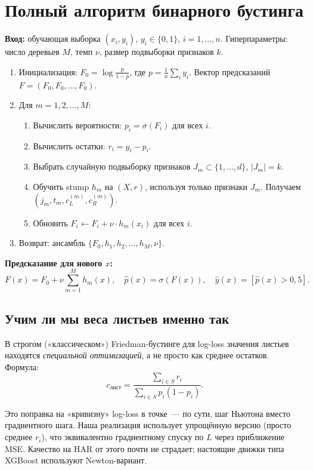\documentclass[12pt,a4paper]{article}
\begin{document}
\section{Полный алгоритм бинарного бустинга}

\textbf{Вход:} обучающая выборка $(x_i, y_i)$, $y_i \in \{0, 1\}$, $i = 1, \ldots, n$. Гиперпараметры: число деревьев $M$, темп $\nu$, размер подвыборки признаков $k$.

\begin{enumerate}
  \item Инициализация:
    $\displaystyle F_0 = \log\frac{p}{1-p}$, где $p = \frac{1}{n}\sum_i y_i$.
    Вектор предсказаний $F = (F_0, F_0, \ldots, F_0)$.
  \item Для $m = 1, 2, \ldots, M$:
    \begin{enumerate}
      \item Вычислить вероятности: $p_i = \sigma(F_i)$ для всех $i$.
      \item Вычислить остатки: $r_i = y_i - p_i$.
      \item Выбрать случайную подвыборку признаков $J_m \subset \{1, \ldots, d\}$, $|J_m| = k$.
      \item Обучить stump $h_m$ на $(X, r)$, используя только признаки $J_m$. Получаем $(j_m, t_m, c_L^{(m)}, c_R^{(m)})$.
      \item Обновить $F_i \leftarrow F_i + \nu \cdot h_m(x_i)$ для всех $i$.
    \end{enumerate}
  \item Возврат: ансамбль $\{F_0, h_1, h_2, \ldots, h_M, \nu\}$.
\end{enumerate}

\textbf{Предсказание для нового $x$:}
\[
  F(x) = F_0 + \nu \sum_{m=1}^M h_m(x), \quad
  \hat{p}(x) = \sigma(F(x)), \quad
  \hat{y}(x) = [\hat{p}(x) > 0{,}5].
\]

\subsection{Учим ли мы веса листьев именно так}

\begin{warning}
В строгом ($\textbf{«классическом»}$) Friedman-бустинге для log-loss значения листьев находятся \emph{специальной оптимизацией}, а не просто как среднее остатков. Формула:
\[
  c_{\text{лист}} = \frac{\sum_{i \in S} r_i}{\sum_{i \in S} p_i (1 - p_i)}.
\]

Это поправка на «кривизну» log-loss в точке~--- по сути, шаг Ньютона вместо градиентного шага. Наша реализация использует упрощённую версию (просто среднее $r_i$), что эквивалентно градиентному спуску по $L$ через приближение MSE. Качество на HAR от этого почти не страдает; настоящие движки типа XGBoost используют Newton-вариант.
\end{warning}
\end{document}
